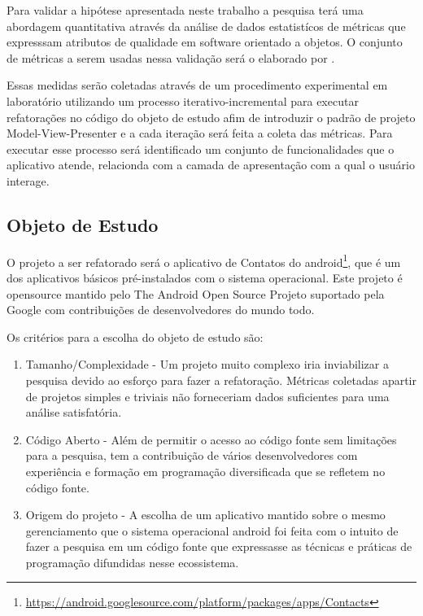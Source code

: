 Para validar a hipótese apresentada neste trabalho a pesquisa terá uma
abordagem quantitativa através da análise de dados estatistícos de métricas 
que expresssam atributos de qualidade em software orientado a objetos. O
conjunto de métricas a serem usadas nessa validação será o elaborado por
.

Essas medidas serão coletadas através de um procedimento experimental em
laboratório utilizando um processo iterativo-incremental para executar
refatorações no código do objeto de estudo afim de introduzir o padrão de
projeto Model-View-Presenter e a cada iteração será feita a coleta das
métricas. Para executar esse processo será identificado um conjunto de
funcionalidades que o aplicativo atende, relacionda com a camada de
apresentação com a qual o usuário interage.

\subsection{Objeto de Estudo}


O projeto a ser refatorado será o aplicativo de Contatos do
android\footnote{\url{https://android.googlesource.com/platform/packages/apps/Contacts}},
que é um dos aplicativos básicos pré-instalados com o sistema operacional. Este
projeto é opensource mantido pelo  The Android Open Source Projeto suportado
pela Google com contribuições de desenvolvedores do mundo todo.

Os critérios para a escolha do objeto de estudo são:

\begin{enumerate}
  \item Tamanho/Complexidade - Um projeto muito complexo iria inviabilizar a
  pesquisa devido ao esforço para fazer a refatoração. Métricas coletadas
  apartir de projetos simples e triviais não forneceriam dados suficientes para
  uma análise satisfatória.
  \item Código Aberto - Além de permitir o acesso ao código fonte sem
  limitações para a pesquisa, tem a contribuição de vários desenvolvedores com
  experiência e formação em programação diversificada que se refletem no código fonte.
  \item Origem do projeto - A escolha de um aplicativo mantido sobre o mesmo
  gerenciamento que o sistema operacional android foi feita com o intuito de
  fazer a pesquisa em um código fonte que expressasse as técnicas e práticas de
  programação difundidas nesse ecossistema.
\end{enumerate}


